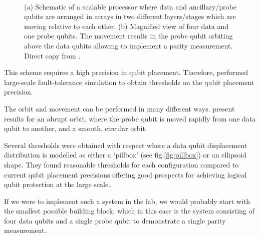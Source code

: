 \begin{figure}[H]
	\centering
	\\
	\caption[paper]{(a) Schematic of a scalable processor where data and ancillary/probe qubits are arranged in arrays in two different layers/stages which are moving relative to each other. (b) Magnified view of four data and one probe qubits. The movement results in the probe qubit orbiting above the data qubits allowing to implement a parity measurement. Direct copy from \cite{OGorman2016}.}
	\label{FIG:paper}
\end{figure}

This scheme requires a high precision in qubit placement. Therefore, \citet{OGorman2016} performed large-scale fault-tolerance simulation to obtain thresholds on the qubit placement precision.

The orbit and movement can be performed in many different ways. \citet{OGorman2016} present results for an abrupt orbit, where the probe qubit is moved rapidly from one data qubit to another, and a smooth, circular orbit.

Several thresholds were obtained with respect where a data qubit displacement distribution is modelled as either a `pillbox' (see fig.\@ \ref{fig:pillbox}) or an ellipsoid shape.
They found reasonable thresholds for each configuration compared to current qubit placement precisions offering good prospects for achieving logical qubit protection at the large scale. 

If we were to implement such a system in the lab, we would probably start with the smallest possible building block, which in this case is the system consisting of four data qubits and a single probe qubit to demonstrate a single parity measurement.
